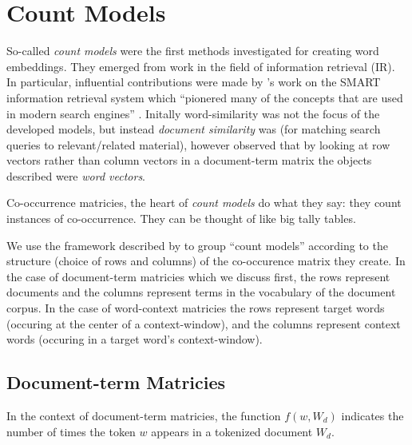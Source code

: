\chapter{Count Models}\label{chap:count-models}
So-called \emph{count models} were the first methods investigated for creating word embeddings. They emerged from work in the field of information retrieval (IR). In particular, influential contributions \parencite{dublin-2004-the-most-influential} were made by \citeauthor{salton-1975-a-vector-space-model}'s \parencite*{salton-1975-a-vector-space-model} work on the SMART information retrieval system which ``pionered many of the concepts that are used in modern search engines'' \parencite{turney10-from-frequen-to-meanin}. Initally word-similarity was not the focus of the developed models, but instead \emph{document similarity} was (for matching search queries to relevant/related material), however \textcite{deerwester-1990-indexing-by-lsa} observed that by looking at row vectors rather than column vectors in a document-term matrix the objects described were \emph{word vectors}.


Co-occurrence matricies, the heart of \emph{count models} do what they say: they count instances of co-occurrence. They can be thought of like big tally tables.

We use the framework described by \textcite{turney10-from-frequen-to-meanin} to group ``count models'' according to the structure (choice of rows and columns) of the co-occurence matrix they create. In the case of document-term matricies which we discuss first, the rows represent documents and the columns represent terms in the vocabulary of the document corpus. In the case of word-context matricies the rows represent target words (occuring at the center of a context-window), and the columns represent context words (occuring in a target word's context-window).

\section{Document-term Matricies}
\begin{definition}
  In the context of document-term matricies, the function $f(w,W_d)$ indicates the number of times the token $w$ appears in a tokenized document $W_d$.
\end{definition}

